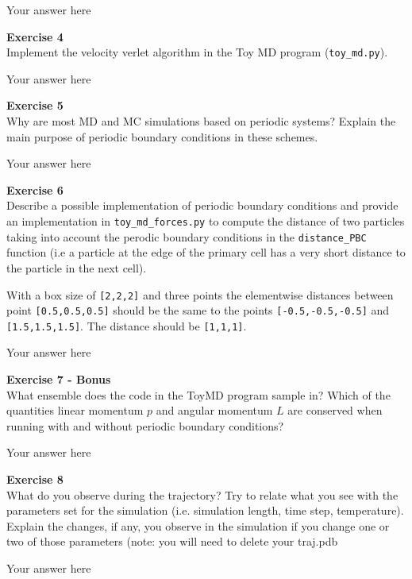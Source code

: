 \documentclass{article}
\begin{document}
Your answer here

\begin{mdframed}
\textbf{Exercise 4}\\
Implement the velocity verlet algorithm in the Toy MD program (\texttt{toy\_md.py}).
\end{mdframed}

Your answer here

\begin{mdframed}
\textbf{Exercise 5}\\
Why are most MD and MC simulations based on periodic systems? Explain the main purpose of periodic boundary conditions in these schemes.
\end{mdframed}

Your answer here

\begin{mdframed}
\textbf{Exercise 6}\\
Describe a possible implementation of periodic boundary conditions and provide an implementation in \texttt{toy\_md\_forces.py} to compute the distance of two particles taking into account the perodic boundary conditions in the \texttt{distance\_PBC} function (i.e a particle at the edge of the primary cell has a very short distance to the particle in the next cell).

With a box size of \texttt{[2,2,2]} and three points the elementwise distances between point \texttt{[0.5,0.5,0.5]} should be the same to the points \texttt{[-0.5,-0.5,-0.5]} and \texttt{[1.5,1.5,1.5]}. The distance should be \texttt{[1,1,1]}.
\end{mdframed}

Your answer here

\begin{mdframed}
\textbf{Exercise 7 - Bonus}\\
What ensemble does the code in the ToyMD program sample in? Which of the quantities linear momentum $p$ and angular momentum $L$ are conserved when running with and without periodic boundary conditions?
\end{mdframed}

Your answer here

\begin{mdframed}
\textbf{Exercise 8}\\
What do you observe during the trajectory? Try to relate what you see with the parameters set for the simulation (i.e. simulation length, time step, temperature). Explain the changes, if any, you observe in the simulation if you change one or two of those parameters (note: you will need to delete your traj.pdb
\end{mdframed}

Your answer here

\end{document}
